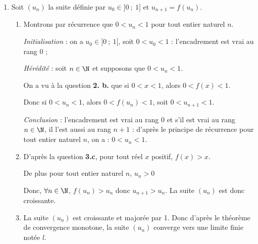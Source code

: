 \begin{enumerate}
\begin{enumerate}
$y=f'(1)(x-1)+f(1)$

		 Avec $f'(1)=1$ et $f(1)=1$, on en déduit l'équation de $(T)~:~y=x-1+1=x$, soit 

$M(x~;~y) \in (T) \iff y = x$.
		\item Nous savons que $\forall x \in ]0~;~+\infty[$, $f'(x)=\ln(x)+1$.

		La fonction $f'$  est continue et dérivable sur $]0~;~+\infty[$, et $f''(x)=\dfrac{1}{x}>0$, donc $f$ est convexe sur $]0~;~+\infty[$.
		\item La courbe représentative d'une fonction convexe est au-dessus de toutes ses tangentes. En particulier $\mathcal{C}_f$ est au-dessus de $(T)$. Donc $\forall x \in ]0~;~+\infty[$, $f(x)\geqslant x$.
	\end{enumerate}
	\item Soit $\left(u_n\right)$ la suite définie par $u_0 \in ]0~;~1]$ et $u_{n+1}=f(u_n)$.
	\begin{enumerate}
		\item Montrons par récurrence que $0 < u_n <1$ pour tout entier naturel $n$.
		
\emph{Initialisation} : on a $u_0 \in ]0~;~1[$, soit $0 < u_0 < 1$ : l'encadrement est vrai au rang $0$ ;

\emph{Hérédité} : soit $n \in \N$ et supposons que $0 < u_n < 1$.

On a vu à la question \textbf{2. b.} que si $0 < x < 1$, alors $0 < f(x) < 1$.

Donc si $0 < u_n < 1$, alors $0 < f\left(u_n\right) < 1$, soit $0 < u_{n+1} < 1$.

\emph{Conclusion} : l'encadrement est vrai au rang 0 et s'il est vrai au rang $n \in \N$, il l'est aussi au rang $n + 1$ : d'après le principe de récurrence pour tout entier naturel $n$, on a : $0 < u_n < 1$.
		

		\item D'après la question \textbf{3.c}, pour tout réel $x$ positif, $f(x)>x$.

De plus pour tout entier naturel $n$, $u_n>0$

Donc, $\forall n \in \N$, $f(u_n)>u_n$ donc $u_{n+1}>u_n$. La suite $\left(u_n\right)$ est donc croissante.
		 \item La suite $\left(u_n\right)$ est croissante et majorée par 1. Donc d'après le théorème de convergence monotone, la suite $\left(u_n\right)$ converge vers une limite finie notée $l$.
	\end{enumerate}
\end{enumerate}

\pagebreak
